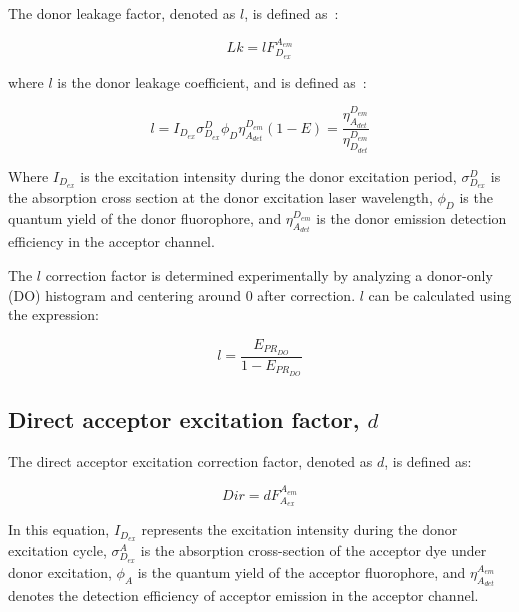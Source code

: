 The donor leakage factor, denoted as $l$, is defined as~\cite{lee_BPJ_2005}:

\begin{equation}
\label{eqn:lk}
Lk = l F_{D_{ex}}^{A_{em}}
\end{equation}

\noindent
where $l$ is the donor leakage coefficient, and is defined as~\cite{lee_BPJ_2005}:

\begin{equation}
    \label{eqn:l}
    l = I_{D_{ex}}\sigma^D_{D_{ex}}\phi_D\eta^{D_{em}}_{A_{det}}(1-E) = \frac{\eta^{D_{em}}_{A_{det}}}{\eta^{D_{em}}_{D_{det}}}
\end{equation}

\noindent
Where $I_{D_{ex}}$ is the excitation intensity during the donor excitation period, $\sigma^D_{D_{ex}}$ is the absorption cross section at the donor excitation laser wavelength, $\phi_D$ is the quantum yield of the donor fluorophore, and $\eta^{D_{em}}_{A_{det}}$ is the donor emission detection efficiency in the acceptor channel.

The $l$ correction factor is determined experimentally by analyzing a donor-only (DO) histogram and centering around 0 after correction. 
$l$ can be calculated using the expression:

\begin{equation}
\label{eqn:lk_do}
l = \frac{E_{{PR}_{DO}}}{1-E_{{PR}_{DO}}}
\end{equation}

\subsection{Direct acceptor excitation factor, $d$}
\label{sec:dir_apdx}

The direct acceptor excitation correction factor, denoted as $d$, is defined as:

\begin{equation}
\label{eqn:dir}
Dir = d F_{A_{ex}}^{A_{em}}
\end{equation}

\noindent
In this equation, $I_{D_{ex}}$ represents the excitation intensity during the donor excitation cycle, $\sigma^A_{D_{ex}}$ is the absorption cross-section of the acceptor dye under donor excitation, $\phi_A$ is the quantum yield of the acceptor fluorophore, and $\eta^{A_{em}}_{A_{det}}$ denotes the detection efficiency of acceptor emission in the acceptor channel.

